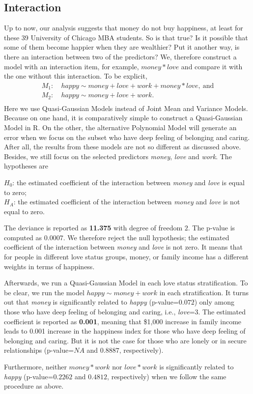 \documentclass[11pt,letterpaper]{article}
\begin{document}
\subsection{Interaction}
Up to now, our analysis suggests that money do not buy happiness, at least for these 39 University of Chicago MBA students. So is that true? Is it possible that some of them become happier when they are wealthier? Put it another way, is there an interaction between two of the predictors? We, therefore  construct a model with an interaction item, for example, $money*love$ and compare it with the one without this interaction. To be explicit,
\begin{equation*}
\begin{aligned}
M_1:\ &happy\sim money+love+work+money*love,\ \mathrm{and} \\
M_2:\ &happy\sim money+love+work. \\
\end{aligned}
\end{equation*}
Here we use Quasi-Gaussian Models instead of Joint Mean and Variance Models. Because on one hand, it is comparatively simple to construct a Quasi-Gaussian Model in R. On the other, the alternative Polynomial Model will generate an error when we focus on the subset who have deep feeling of belonging and caring. After all, the results from these models are not so different as discussed above. Besides, we still focus on the selected predictors \emph{money}, \emph{love} and \emph{work}. The hypotheses are \par $H_0$: the estimated coefficient of the interaction between \emph{money} and \emph{love} is equal to zero; \\
$H_A$: the estimated coefficient of the interaction between \emph{money} and \emph{love} is not equal to zero. \par
The deviance is reported as {\bf 11.375} with degree of freedom $2$. The p-value is computed as $0.0007$. We therefore reject the null hypothesis; the estimated coefficient of the interaction between \emph{money} and \emph{love} is not zero. It means that for people in different love status groups, money, or family income has a different weights in terms of happiness. \par
Afterwards, we run a Quasi-Gaussian Model in each love status stratification. To be clear, we run the model $happy\sim money+work$ in each stratification. It turns out that \emph{money} is significantly related to \emph{happy} (p-value=$0.072$) only among those who have deep feeling of belonging and caring, i.e., \emph{love}=3. The estimated coefficient is reported as {\bf 0.001}, meaning that \$1,000 increase in family income leads to 0.001 increase in the happiness index for those who have deep feeling of belonging and caring. But it is not the case for those who are lonely or in secure relationships (p-value=$NA$ and $0.8887$, respectively). \par
Furthermore, neither $money*work$ nor $love*work$ is significantly related to \emph{happy} (p-value=$0.2262$ and $0.4812$, respectively) when we follow the same procedure as above.
\end{document}
